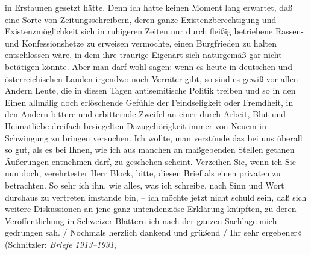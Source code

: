 {{{                        in Erstaunen gesetzt hätte. Denn ich hatte keinen Moment lang erwartet, daß
                        eine Sorte von Zeitungsschreibern, deren ganze Existenzberechtigung und
                        Existenzmöglichkeit sich in ruhigeren Zeiten nur durch fleißig betriebene
                        Rassen- und Konfessionshetze zu erweisen vermochte, einen Burgfrieden zu
                        halten entschlossen wäre, in dem ihre traurige Eigenart sich naturgemäß gar
                        nicht betätigen könnte. Aber man darf wohl sagen: wenn es heute in deutschen und österreichischen Landen irgendwo noch Verräter gibt, so sind es
                        gewiß vor allen Andern Leute, die in diesen Tagen antisemitische Politik
                        treiben und so in den Einen allmälig doch erlöschende Gefühle der
                        Feindseligkeit oder Fremdheit, in den Andern bittere und erbitternde Zweifel
                        an einer durch Arbeit, Blut und Heimatliebe dreifach besiegelten
                        Dazugehörigkeit immer von Neuem in Schwingung zu bringen versuchen. Ich
                        wollte, man verstünde das bei uns überall so gut, als es bei Ihnen, wie ich
                        aus manchen an maßgebenden Stellen getanen Äußerungen entnehmen darf, zu
                        geschehen scheint. Verzeihen Sie, wenn ich Sie nun doch, verehrtester Herr
                        Block, bitte, diesen Brief als einen privaten zu betrachten. So sehr ich
                        ihn, wie alles, was ich schreibe, nach Sinn und Wort durchaus zu vertreten
                        imstande bin, – ich möchte jetzt nicht schuld sein, daß sich weitere
                        Diskussionen an jene ganz untendenziöse Erklärung knüpften, zu deren Veröffentlichung in Schweizer Blättern ich nach der
                        ganzen Sachlage mich gedrungen sah.{ / }Nochmals herzlich dankend und grüßend{ / }Ihr sehr ergebener« (Schnitzler: \emph{Briefe 1913–1931},
}}}
